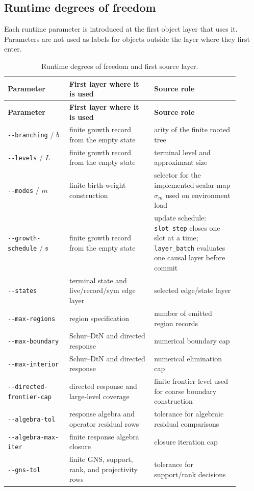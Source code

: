 \documentclass[11pt]{article}
\theoremstyle{remark}
\newcommand{\code}[1]{\texttt{#1}}
\numberwithin{equation}{section}
\begin{document}
\subsection{Runtime degrees of freedom}
Each runtime parameter is introduced at the first object layer that uses it. Parameters are not used as labels for objects outside the layer where they first enter.
\begin{longtable}{>{\raggedright\arraybackslash}p{0.24\linewidth}>{\raggedright\arraybackslash}p{0.33\linewidth}>{\raggedright\arraybackslash}p{0.33\linewidth}}
\caption{Runtime degrees of freedom and first source layer.}\label{tab:runtime-dof}\\
\toprule
\textbf{Parameter} & \textbf{First layer where it is used} & \textbf{Source role}\\
\midrule
\endfirsthead
\toprule
\textbf{Parameter} & \textbf{First layer where it is used} & \textbf{Source role}\\
\midrule
\endhead
\code{-{}-branching} / $b$ & finite growth record from the empty state & arity of the finite rooted tree\\
\hline
\code{-{}-levels} / $L$ & finite growth record from the empty state & terminal level and approximant size\\
\hline
\code{-{}-modes} / $m$ & finite birth-weight construction & selector for the implemented scalar map $\sigma_m$ used on environment load\\
\hline
\code{-{}-growth-\allowbreak{}schedule} / $\mathfrak{s}$ & finite growth record from the empty state & update schedule: \code{slot\_\allowbreak{}step} closes one slot at a time; \code{layer\_\allowbreak{}batch} evaluates one causal layer before commit\\
\hline
\code{-{}-states} & terminal state and live/record/sym edge layer & selected edge/state layer\\
\hline
\code{-{}-max-\allowbreak{}regions} & region specification & number of emitted region records\\
\hline
\code{-{}-max-\allowbreak{}boundary} & Schur--DtN and directed response & numerical boundary cap\\
\hline
\code{-{}-max-\allowbreak{}interior} & Schur--DtN and directed response & numerical elimination cap\\
\hline
\code{-{}-directed-\allowbreak{}frontier-\allowbreak{}cap} & directed response and large-level coverage & finite frontier level used for coarse boundary construction\\
\hline
\code{-{}-algebra-\allowbreak{}tol} & response algebra and operator residual rows & tolerance for algebraic residual comparisons\\
\hline
\code{-{}-algebra-\allowbreak{}max-\allowbreak{}iter} & finite response algebra closure & closure iteration cap\\
\hline
\code{-{}-gns-\allowbreak{}tol} & finite GNS, support, rank, and projectivity rows & tolerance for support/rank decisions\\
\bottomrule
\end{longtable}
\end{document}

